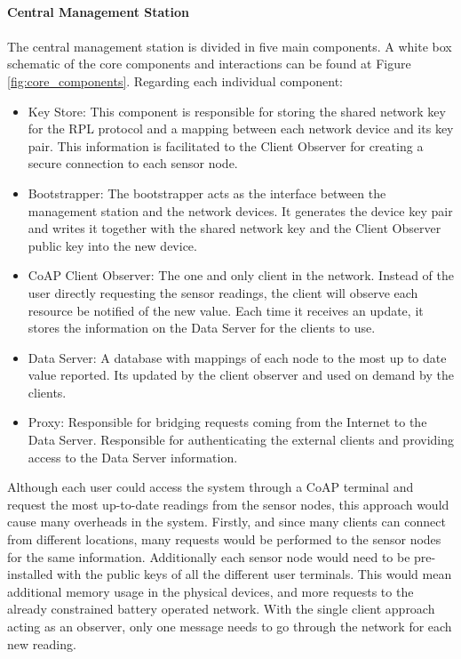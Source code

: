 \paragraph{\textbf{Central Management Station}}
\paragraph{}

The central management station is divided in five main components. A white box schematic of the core components and interactions can be found at Figure \ref{fig:core_components}. Regarding each individual component:

\begin{itemize}
	\item Key Store: This component is responsible for storing the shared network key for the RPL protocol and a mapping between each network device and its key pair. This information is facilitated to the Client Observer for creating a secure connection to each sensor node.\\
	\item Bootstrapper: The bootstrapper acts as the interface between the management station and the network devices. It generates the device key pair and writes it together with the shared network key and the Client Observer public key into the new device.\\
	\item CoAP Client Observer:  The one and only client in the network. Instead of the user directly requesting the sensor readings, the client will observe each resource be notified of the new value. Each time it receives an update, it stores the information on the Data Server for the clients to use.\\
	\item Data Server: A database with mappings of each node to the most up to date value reported. Its updated by the client observer and used on demand by the clients.\\
	\item Proxy: Responsible for bridging requests coming from the Internet to the Data Server. Responsible for authenticating the external clients and providing access to the Data Server information.\\
\end{itemize}

Although each user could access the system through a \ac{CoAP} terminal and request the most up-to-date readings from the sensor nodes, this approach would cause many overheads in the system. Firstly, and since many clients can connect from different locations, many requests would be performed to the sensor nodes for the same information. Additionally each sensor node would need to be pre-installed with the public keys of all the different user terminals. This would mean additional memory usage in the physical devices, and more requests to the already constrained battery operated network. With the single client approach acting as an observer, only one message needs to go through the network for each new reading.

